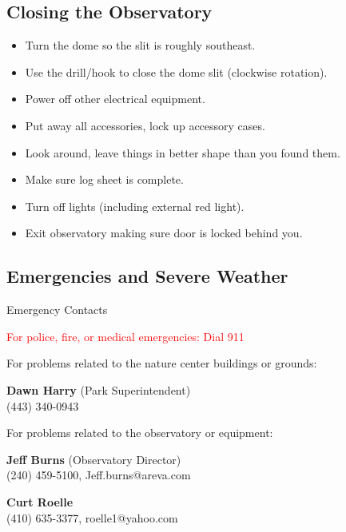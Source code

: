 \subsection{Closing the Observatory}
\begin{frame}{\insertsubsectionhead}
  \Large
  \begin{itemize}
    \item Turn the dome so the slit is roughly southeast.
    \item Use the drill/hook to close the dome slit (clockwise rotation).
    \item Power off other electrical equipment.
    \item Put away all accessories, lock up accessory cases.
    \item Look around, leave things in better shape than you found them.
    \item Make sure log sheet is complete.
    \item Turn off lights (including external red light).
    \item Exit observatory making sure door is locked behind you.
  \end{itemize}
 \end{frame}

\subsection{Emergencies and Severe Weather}
\begin{frame}[t]{Emergency Contacts}
  
  {\LARGE\centering
  \textcolor{red}{For police, fire, or medical emergencies: Dial 911}}

  For problems related to the nature center buildings or grounds:

  \textbf{Dawn Harry} (Park Superintendent)\\
  (443) 340-0943

  For problems related to the observatory or equipment:

  \textbf{Jeff Burns} (Observatory Director)\\
  (240) 459-5100, Jeff.burns@areva.com

  \textbf{Curt Roelle}\\
  (410) 635-3377, roelle1@yahoo.com 
\end{frame}


